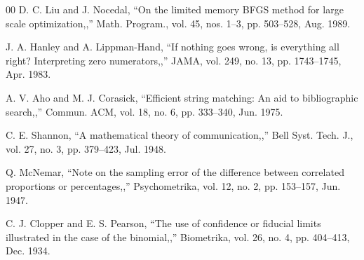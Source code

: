 \documentclass[conference]{IEEEtran}
\begin{document}
\begin{thebibliography}{00}
D. C. Liu and J. Nocedal, ``On the limited memory BFGS method for large scale optimization,,'' Math. Program., vol. 45, nos. 1–3, pp. 503–528, Aug. 1989.

J. A. Hanley and A. Lippman-Hand, ``If nothing goes wrong, is everything all right? Interpreting zero numerators,,'' JAMA, vol. 249, no. 13, pp. 1743–1745, Apr. 1983.

A. V. Aho and M. J. Corasick, ``Efficient string matching: An aid to bibliographic search,,'' Commun. ACM, vol. 18, no. 6, pp. 333–340, Jun. 1975.

C. E. Shannon, ``A mathematical theory of communication,,'' Bell Syst. Tech. J., vol. 27, no. 3, pp. 379–423, Jul. 1948.

Q. McNemar, ``Note on the sampling error of the difference between correlated proportions or percentages,,'' Psychometrika, vol. 12, no. 2, pp. 153–157, Jun. 1947.

C. J. Clopper and E. S. Pearson, ``The use of confidence or fiducial limits illustrated in the case of the binomial,,'' Biometrika, vol. 26, no. 4, pp. 404–413, Dec. 1934.
\end{thebibliography}
\end{document}
